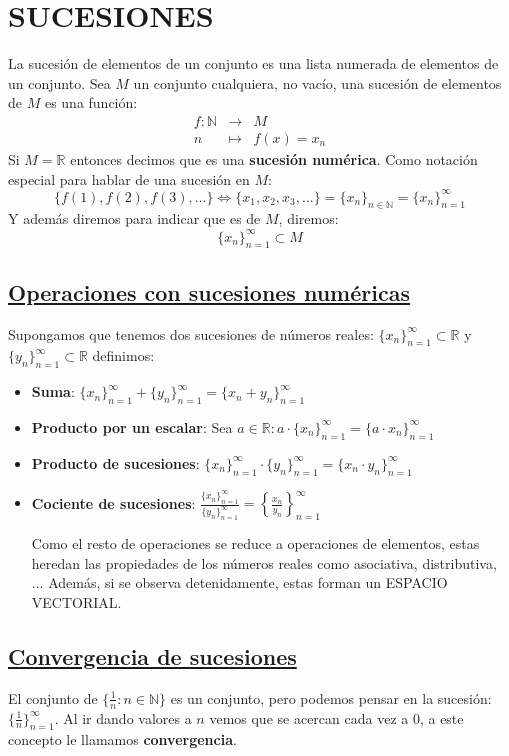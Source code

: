 \documentclass[10pt,a4paper,openright]{book}
\begin{document}
\section*{SUCESIONES}
La sucesión de elementos de un conjunto es una lista numerada de elementos de un conjunto. Sea $M$ un conjunto cualquiera, no vacío, una sucesión de elementos de $M$ es una función:
\begin{eqnarray*}
f: \mathbb N &\rightarrow& M \\
n &\longmapsto& f(x)=x_n
\end{eqnarray*}
Si $M=\mathbb R$ entonces decimos que es una \textbf{sucesión numérica}. Como notación especial para hablar de una sucesión en $M$:
$$\{f(1),f(2),f(3), ...\}\Leftrightarrow \{x_1,x_2,x_3,...\}=\{x_n\}_{n\in \mathbb N}=\{x_n\}_{n=1}^{\infty}$$
Y además diremos para indicar que es de $M$, diremos:
$$\{x_n\}_{n=1}^{\infty}\subset M$$
\subsection*{\underline{Operaciones con sucesiones numéricas}}
Supongamos que tenemos dos sucesiones de números reales: $\{x_n\}_{n=1}^{\infty}\subset \mathbb R$ y $\{y_n\}_{n=1}^{\infty}\subset \mathbb R$ definimos:
\begin{itemize}
\item \textbf{Suma}: $\{x_n\}_{n=1}^{\infty}+\{y_n\}_{n=1}^{\infty}=\{x_n+y_n\}_{n=1}^{\infty}$

\item \textbf{Producto por un escalar}: Sea $a\in \mathbb R: a\cdot \{x_n\}_{n=1}^{\infty}=\{a\cdot x_n\}_{n=1}^{\infty}$

\item \textbf{Producto de sucesiones}: $\{x_n\}_{n=1}^{\infty}\cdot \{y_n\}_{n=1}^{\infty}=\{x_n\cdot y_n\}_{n=1}^{\infty}$

\item \textbf{Cociente de sucesiones}: $\frac{\{x_n\}_{n=1}^{\infty}}{\{y_n\}_{n=1}^{\infty}}=\left\lbrace\frac{x_n}{y_n}\right\rbrace_{n=1}^{\infty}$

Como el resto de operaciones se reduce a operaciones de elementos, estas heredan las propiedades de los números reales como asociativa, distributiva, ... Además, si se observa detenidamente, estas forman un ESPACIO VECTORIAL.
\end{itemize}

\subsection*{\underline{Convergencia de sucesiones}}
El conjunto de $\{\frac{1}{n}: n\in \mathbb N\}$ es un conjunto, pero podemos pensar en la sucesión: $\{\frac{1}{n}\}_{n=1}^{\infty}$. Al ir dando valores a $n$ vemos que se acercan cada vez a 0, a este concepto le llamamos \textbf{convergencia}.\par
\end{document}
